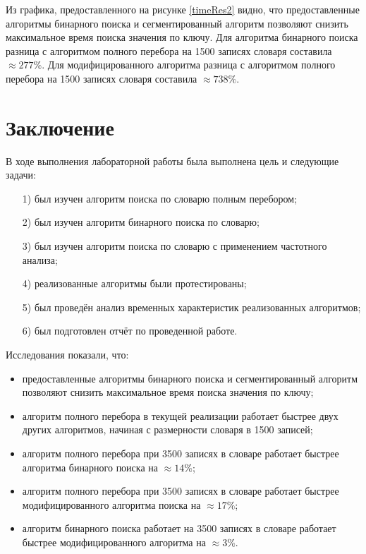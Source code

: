 \documentclass[12pt]{report}
\begin{document}
Из графика, предоставленного на рисунке \ref{timeRes2} видно, что предоставленные алгоритмы бинарного поиска и сегментированный алгоритм позволяют снизить максимальное время поиска значения по ключу. Для алгоритма бинарного поиска разница с алгоритмом полного перебора на 1500 записях словаря составила $\approx 277\%$. Для модифицированного алгоритма разница с алгоритмом полного перебора на 1500 записях словаря составила $\approx 738\%$.

\chapter*{Заключение}
В ходе выполнения лабораторной работы была выполнена цель и следующие задачи:
\begin{enumerate}
\item[1)] был изучен алгоритм поиска по словарю полным перебором;
\item[2)] был изучен алгоритм бинарного поиска по словарю;
\item[3)] был изучен алгоритм поиска по словарю с применением частотного анализа;
\item[4)] реализованные алгоритмы были протестированы;
\item[5)] был проведён анализ временных характеристик реализованных алгоритмов;
\item[6)] был подготовлен отчёт по проведенной работе.
\end{enumerate}

Исследования показали, что:
\begin{itemize}
\item предоставленные алгоритмы бинарного поиска и сегментированный алгоритм позволяют снизить максимальное время поиска значения по ключу;
\item алгоритм полного перебора в текущей реализации работает быстрее двух других алгоритмов, начиная с размерности словаря в 1500 записей;
\item алгоритм полного перебора при 3500 записях в словаре работает быстрее алгоритма бинарного поиска на $\approx 14\%$;
\item алгоритм полного перебора при 3500 записях в словаре работает быстрее модифицированного алгоритма поиска на $\approx 17\%$;
\item алгоритм бинарного поиска работает на 3500 записях в словаре работает быстрее модифицированного алгоритма на $\approx 3\%$.
\end{itemize}

\end{document}
